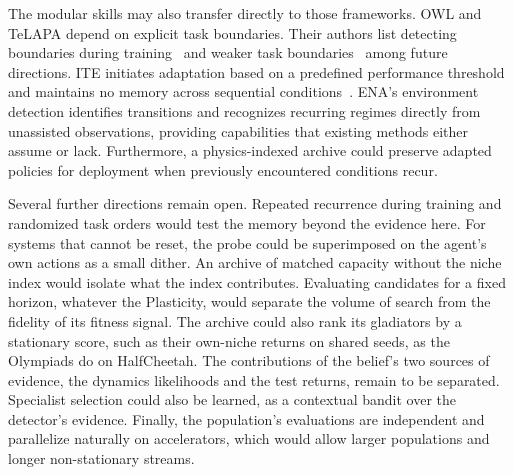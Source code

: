 The modular skills may also transfer directly to those frameworks. OWL and TeLAPA depend on explicit task boundaries. Their authors list detecting boundaries during training~\cite{kessler2022same} and weaker task boundaries~\cite{lillo2026beyond} among future directions. ITE initiates adaptation based on a predefined performance threshold and maintains no memory across sequential conditions~\cite{cully2015robots}. ENA's environment detection identifies transitions and recognizes recurring regimes directly from unassisted observations, providing capabilities that existing methods either assume or lack. Furthermore, a physics-indexed archive could preserve adapted policies for deployment when previously encountered conditions recur.

Several further directions remain open. Repeated recurrence during training and randomized task orders would test the memory beyond the evidence here. For systems that cannot be reset, the probe could be superimposed on the agent's own actions as a small dither. An archive of matched capacity without the niche index would isolate what the index contributes. Evaluating candidates for a fixed horizon, whatever the Plasticity, would separate the volume of search from the fidelity of its fitness signal. The archive could also rank its gladiators by a stationary score, such as their own-niche returns on shared seeds, as the Olympiads do on HalfCheetah. The contributions of the belief's two sources of evidence, the dynamics likelihoods and the test returns, remain to be separated. Specialist selection could also be learned, as a contextual bandit over the detector's evidence. Finally, the population's evaluations are independent and parallelize naturally on accelerators, which would allow larger populations and longer non-stationary streams.
